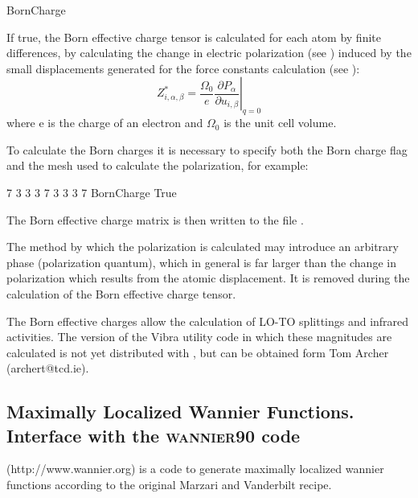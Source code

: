 \begin{fdflogicalF}{BornCharge}

  If true, the Born effective charge tensor is calculated for each
  atom by finite differences, by calculating the change in electric
  polarization (see ) induced by the small
  displacements generated for the force constants calculation (see
   ):
  \begin{equation}
    \label{eq:effective_charge}
    Z^*_{i,\alpha,\beta}=\frac{\Omega_0}{e} \left. {\frac{\partial{P_\alpha}}
          {\partial{u_{i,\beta}}}}\right|_{q=0}
  \end{equation}
  where e is the charge of an electron and $\Omega_0$ is the unit cell
  volume.

  To calculate the Born charges it is necessary to specify both the
  Born charge flag and the mesh used to calculate the polarization,
  for example:
  \begin{fdfexample}
      7  3  3
      3  7  3
      3  3  7
    BornCharge True
  \end{fdfexample}

  The Born effective charge matrix is then written to the file
  .

  The method by which the polarization is calculated may introduce an
  arbitrary phase (polarization quantum), which in general is far
  larger than the change in polarization which results from the atomic
  displacement. It is removed during the calculation of the Born
  effective charge tensor.

  The Born effective charges allow the calculation of LO-TO splittings
  and infrared activities. The version of the Vibra utility code in
  which these magnitudes are calculated is not yet distributed with
  \siesta, but can be obtained form Tom Archer (archert@tcd.ie).

\end{fdflogicalF}



\subsection[Maximally Localized Wannier Functions]%
{Maximally Localized Wannier Functions. \\
    Interface with the \textsc{wannier90} code}

 (http://www.wannier.org) is a code to generate
maximally localized wannier functions according to the original
Marzari and Vanderbilt recipe.

